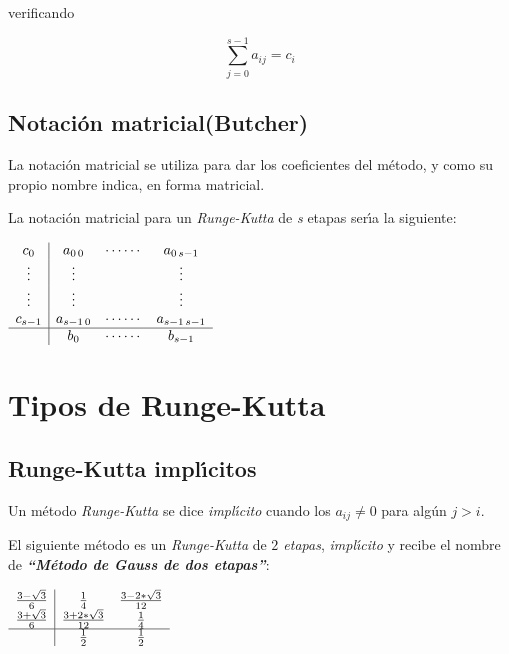 verificando

\begin{equation}
\sum_{j=0}^{s-1} a_{ij} = c_i
\end{equation}

\subsection{Notaci\'on matricial(Butcher)}

La notaci\'on matricial se utiliza para dar los coeficientes del m\'etodo, y
como su propio nombre indica, en forma matricial.\newline

La notaci\'on matricial para un \emph{Runge-Kutta} de \emph{s} etapas 
ser\'{\i}a la siguiente: 

\begin{center}
$
\begin{array}{c|ccc}
c_0 & a_{0\,0} & \cdots \cdots & a_{0\,s-1} \\
\vdots & \vdots & & \vdots \\
\vdots & \vdots & & \vdots \\
c_{s-1} & a_{s-1\,0} & \cdots \cdots & a_{s-1\,s-1} \\
\hline
 & b_0 & \cdots \cdots & b_{s-1} \\
\end{array}
$
\end{center}

\newpage

\section{Tipos de Runge-Kutta}

\subsection{Runge-Kutta impl\'{\i}citos}

Un m\'etodo \emph{Runge-Kutta} se dice \emph{impl\'{\i}cito} cuando los $a_{ij}
\neq 0$ para alg\'un $j > i$.\newline

El siguiente m\'etodo es un \emph{Runge-Kutta} de \emph{$2$ etapas},
\emph{impl\'{\i}cito} y recibe el nombre de \emph{\textbf{``M\'etodo de Gauss 
de dos etapas''}}:

\begin{center}
$
\begin{array}{c|cc}
\frac{3-\sqrt 3}{6} & \frac{1}{4} & \frac{3-2*\sqrt 3}{12} \\
\frac{3+\sqrt 3}{6} & \frac{3+2*\sqrt 3}{12} &\frac{1}{4} \\
\hline
 & \frac{1}{2} & \frac{1}{2}
\end{array}
$
\end{center}

